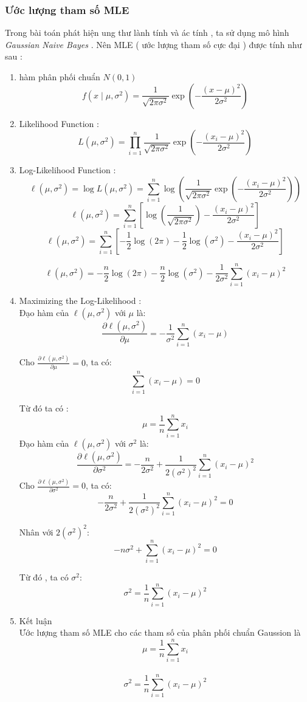 \subsubsection{Ước lượng tham số MLE} 
Trong bài toán phát hiện ung thư lành tính và ác tính , ta sử dụng mô hình \textit{Gaussian Naive Bayes} . Nên MLE ( ước lượng tham số cực đại ) được tính như sau : 
\begin{enumerate}
    \item  hàm phân phối chuẩn $N(0 , 1)$ 
    \[
f(x \mid \mu, \sigma^2) = \frac{1}{\sqrt{2\pi\sigma^2}} \exp\left( -\frac{(x - \mu)^2}{2\sigma^2} \right)
\]
    \item Likelihood Function : 
    \[
L(\mu, \sigma^2) = \prod_{i=1}^n \frac{1}{\sqrt{2\pi\sigma^2}} \exp\left( -\frac{(x_i - \mu)^2}{2\sigma^2} \right)
\]
    \item Log-Likelihood Function : 
    \[
\ell(\mu, \sigma^2) = \log L(\mu, \sigma^2) = \sum_{i=1}^n \log\left( \frac{1}{\sqrt{2\pi\sigma^2}} \exp\left( -\frac{(x_i - \mu)^2}{2\sigma^2} \right) \right)
\]
    \[
\ell(\mu, \sigma^2) = \sum_{i=1}^n \left[ \log\left( \frac{1}{\sqrt{2\pi\sigma^2}} \right) - \frac{(x_i - \mu)^2}{2\sigma^2} \right]
\]
    \[
\ell(\mu, \sigma^2) = \sum_{i=1}^n \left[ -\frac{1}{2} \log(2\pi) - \frac{1}{2} \log(\sigma^2) - \frac{(x_i - \mu)^2}{2\sigma^2} \right]
\]

\[
\ell(\mu, \sigma^2) = -\frac{n}{2} \log(2\pi) - \frac{n}{2} \log(\sigma^2) - \frac{1}{2\sigma^2} \sum_{i=1}^n (x_i - \mu)^2
\]
    \item Maximizing the Log-Likelihood : \\
    Đạo hàm của \(\ell(\mu, \sigma^2)\) với \(\mu\) là:
\[
\frac{\partial \ell(\mu, \sigma^2)}{\partial \mu} = -\frac{1}{\sigma^2} \sum_{i=1}^n (x_i - \mu)
\]

Cho \(\frac{\partial \ell(\mu, \sigma^2)}{\partial \mu} = 0\), ta có:
\[
\sum_{i=1}^n (x_i - \mu) = 0
\]

Từ đó ta có : 
\[
\mu = \frac{1}{n} \sum_{i=1}^n x_i
\]
    Đạo hàm của \(\ell(\mu, \sigma^2)\) với \(\sigma^2\) là:
\[
\frac{\partial \ell(\mu, \sigma^2)}{\partial \sigma^2} = -\frac{n}{2\sigma^2} + \frac{1}{2(\sigma^2)^2} \sum_{i=1}^n (x_i - \mu)^2
\]
    Cho \(\frac{\partial \ell(\mu, \sigma^2)}{\partial \sigma^2} = 0\), ta có:
\[
-\frac{n}{2\sigma^2} + \frac{1}{2(\sigma^2)^2} \sum_{i=1}^n (x_i - \mu)^2 = 0
\]

Nhân với \(2(\sigma^2)^2\):
\[
-n\sigma^2 + \sum_{i=1}^n (x_i - \mu)^2 = 0
\]

Từ đó , ta có \(\sigma^2\):
\[
\sigma^2 = \frac{1}{n} \sum_{i=1}^n (x_i - \mu)^2
\]
    \item Kết luận \\
    Ước lượng tham số MLE cho các tham số của phân phối chuẩn Gaussion là \\ 
    \[
    \mu = \frac{1}{n} \sum_{i=1}^n x_i
    \]
     \\
    \[
    \sigma^2 = \frac{1}{n} \sum_{i=1}^n (x_i - \mu)^2
    \]

\end{enumerate}
